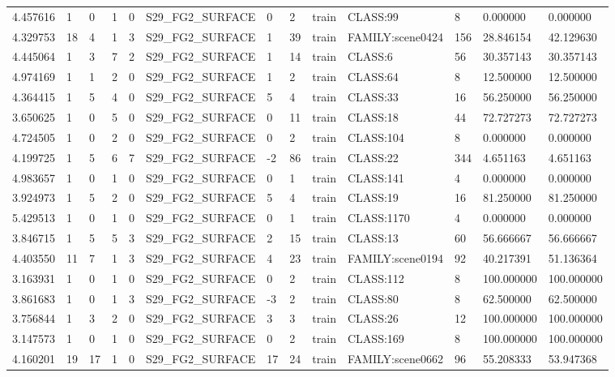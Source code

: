 \begin{tabular}{lllllllllllll}
4.457616 & 1 & 0 & 1 & 0 & S29\_FG2\_SURFACE & 0 & 2 & train & CLASS:99 & 8 & 0.000000 & 0.000000 \\
4.329753 & 18 & 4 & 1 & 3 & S29\_FG2\_SURFACE & 1 & 39 & train & FAMILY:scene0424 & 156 & 28.846154 & 42.129630 \\
4.445064 & 1 & 3 & 7 & 2 & S29\_FG2\_SURFACE & 1 & 14 & train & CLASS:6 & 56 & 30.357143 & 30.357143 \\
4.974169 & 1 & 1 & 2 & 0 & S29\_FG2\_SURFACE & 1 & 2 & train & CLASS:64 & 8 & 12.500000 & 12.500000 \\
4.364415 & 1 & 5 & 4 & 0 & S29\_FG2\_SURFACE & 5 & 4 & train & CLASS:33 & 16 & 56.250000 & 56.250000 \\
3.650625 & 1 & 0 & 5 & 0 & S29\_FG2\_SURFACE & 0 & 11 & train & CLASS:18 & 44 & 72.727273 & 72.727273 \\
4.724505 & 1 & 0 & 2 & 0 & S29\_FG2\_SURFACE & 0 & 2 & train & CLASS:104 & 8 & 0.000000 & 0.000000 \\
4.199725 & 1 & 5 & 6 & 7 & S29\_FG2\_SURFACE & -2 & 86 & train & CLASS:22 & 344 & 4.651163 & 4.651163 \\
4.983657 & 1 & 0 & 1 & 0 & S29\_FG2\_SURFACE & 0 & 1 & train & CLASS:141 & 4 & 0.000000 & 0.000000 \\
3.924973 & 1 & 5 & 2 & 0 & S29\_FG2\_SURFACE & 5 & 4 & train & CLASS:19 & 16 & 81.250000 & 81.250000 \\
5.429513 & 1 & 0 & 1 & 0 & S29\_FG2\_SURFACE & 0 & 1 & train & CLASS:1170 & 4 & 0.000000 & 0.000000 \\
3.846715 & 1 & 5 & 5 & 3 & S29\_FG2\_SURFACE & 2 & 15 & train & CLASS:13 & 60 & 56.666667 & 56.666667 \\
4.403550 & 11 & 7 & 1 & 3 & S29\_FG2\_SURFACE & 4 & 23 & train & FAMILY:scene0194 & 92 & 40.217391 & 51.136364 \\
3.163931 & 1 & 0 & 1 & 0 & S29\_FG2\_SURFACE & 0 & 2 & train & CLASS:112 & 8 & 100.000000 & 100.000000 \\
3.861683 & 1 & 0 & 1 & 3 & S29\_FG2\_SURFACE & -3 & 2 & train & CLASS:80 & 8 & 62.500000 & 62.500000 \\
3.756844 & 1 & 3 & 2 & 0 & S29\_FG2\_SURFACE & 3 & 3 & train & CLASS:26 & 12 & 100.000000 & 100.000000 \\
3.147573 & 1 & 0 & 1 & 0 & S29\_FG2\_SURFACE & 0 & 2 & train & CLASS:169 & 8 & 100.000000 & 100.000000 \\
4.160201 & 19 & 17 & 1 & 0 & S29\_FG2\_SURFACE & 17 & 24 & train & FAMILY:scene0662 & 96 & 55.208333 & 53.947368 \\

\end{tabular}
